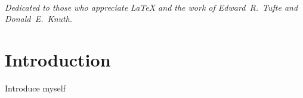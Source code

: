 \documentclass[a4paper, notoc]{tufte-book}
\begin{document}

\tableofcontents %


\listoffigures %


\listoftables %


\cleardoublepage
~\vfill
\begin{doublespace}
\noindent\fontsize{18}{22}\selectfont\itshape
\nohyphenation
Dedicated to those who appreciate \LaTeX{} and the work of \mbox{Edward R.~Tufte} and \mbox{Donald E.~Knuth}.
\end{doublespace}
\vfill
\vfill


\cleardoublepage
\chapter*{Introduction} %
Introduce myself


\mainmatter










\backmatter




\printindex %
\end{document}
